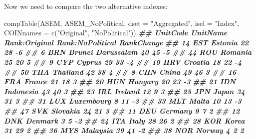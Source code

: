 \documentclass[
]{book}
\newenvironment{Shaded}{\begin{snugshade}}{\end{snugshade}}
\newcommand{\AttributeTok}[1]{\textcolor[rgb]{0.77,0.63,0.00}{#1}}
\newcommand{\DocumentationTok}[1]{\textcolor[rgb]{0.56,0.35,0.01}{\textbf{\textit{#1}}}}
\newcommand{\FunctionTok}[1]{\textcolor[rgb]{0.00,0.00,0.00}{#1}}
\newcommand{\NormalTok}[1]{#1}
\newcommand{\StringTok}[1]{\textcolor[rgb]{0.31,0.60,0.02}{#1}}
\begin{document}
Now we need to compare the two alternative indexes:

\begin{Shaded}
\begin{Highlighting}[]
\FunctionTok{compTable}\NormalTok{(ASEM, ASEM\_NoPolitical, }\AttributeTok{dset =} \StringTok{"Aggregated"}\NormalTok{, }\AttributeTok{isel =} \StringTok{"Index"}\NormalTok{,}
          \AttributeTok{COINnames =} \FunctionTok{c}\NormalTok{(}\StringTok{"Original"}\NormalTok{, }\StringTok{"NoPolitical"}\NormalTok{))}
\DocumentationTok{\#\#    UnitCode           UnitName Rank:Original Rank:NoPolitical RankChange}
\DocumentationTok{\#\# 14      EST            Estonia            22               28         {-}6}
\DocumentationTok{\#\# 6       BRN  Brunei Darussalam            40               45         {-}5}
\DocumentationTok{\#\# 44      ROU            Romania            25               20          5}
\DocumentationTok{\#\# 9       CYP             Cyprus            29               33         {-}4}
\DocumentationTok{\#\# 19      HRV            Croatia            18               22         {-}4}
\DocumentationTok{\#\# 50      THA           Thailand            42               38          4}
\DocumentationTok{\#\# 8       CHN              China            49               46          3}
\DocumentationTok{\#\# 16      FRA             France            21               18          3}
\DocumentationTok{\#\# 20      HUN            Hungary            20               23         {-}3}
\DocumentationTok{\#\# 21      IDN          Indonesia            43               40          3}
\DocumentationTok{\#\# 23      IRL            Ireland            12                9          3}
\DocumentationTok{\#\# 25      JPN              Japan            34               31          3}
\DocumentationTok{\#\# 31      LUX         Luxembourg             8               11         {-}3}
\DocumentationTok{\#\# 33      MLT              Malta            10               13         {-}3}
\DocumentationTok{\#\# 47      SVK           Slovakia            24               21          3}
\DocumentationTok{\#\# 11      DEU            Germany             9                7          2}
\DocumentationTok{\#\# 12      DNK            Denmark             3                5         {-}2}
\DocumentationTok{\#\# 24      ITA              Italy            28               26          2}
\DocumentationTok{\#\# 28      KOR              Korea            31               29          2}
\DocumentationTok{\#\# 36      MYS           Malaysia            39               41         {-}2}
\DocumentationTok{\#\# 38      NOR             Norway             4                2          2}

\end{Highlighting}
\end{Shaded}
\end{document}
